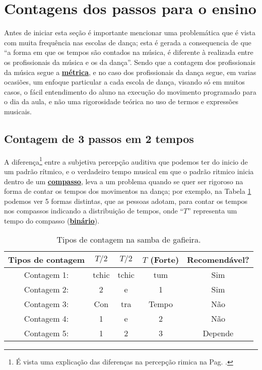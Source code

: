 \section{Contagens dos passos para o ensino}
Antes de iniciar esta seção é importante mencionar uma
problemática que é vista com muita frequência nas escolas de dança; 
esta é gerada a consequencia de que ``a forma em que os tempos são contados 
na música, é diferente à realizada entre os profissionais da música e os da dança''. 
Sendo que a contagem dos profissionais da música segue a \hyperref[def:Metrica]{\textbf{métrica}},
e no caso dos profissionais da dança segue, em varias ocasiões, 
um enfoque particular a cada escola de dança, visando só em muitos casos, 
o fácil entendimento do aluno na execução do movimento programado para o dia da aula, 
e não uma rigorosidade teórica no uso de termos e expressões musicais.



\subsection{Contagem de 3 passos em 2 tempos}
\label{susec:3passos2tempos}
A diferença\footnote{É vista uma explicação das diferenças na percepção rimica na Pag. \pageref{fig:RitmoVsFala}.} 
entre a subjetiva percepção auditiva que podemos ter do inicio de um padrão rítmico, 
e o verdadeiro tempo musical em que o padrão ritmico inicia dentro  de um \hyperref[def:Compasso]{\textbf{compasso}}, 
leva a um problema quando se quer ser rigoroso na forma de contar os tempos dos movimentos na dança; 
por exemplo, na Tabela \ref{tab:ritmo1} podemos ver 5 formas distintas, que  as pessoas adotam, 
para contar os tempos nos compassos indicando a distribuição de tempos, 
onde ``$T$'' representa um tempo do compasso (\hyperref[subsec:compassobinario]{\textbf{binário}}).
\begin{table}[!h]
  \centering
  \begin{tabular}    {c|ccc|c}
    \hline
    Tipos de contagem       & $T/2$ & $T/2$   & $T$ (Forte) & Recomendável?\\
    \hline
    Contagem 1: & tchic  & tchic  & tum   & Sim\\
    Contagem 2: & 2     & e     & 1     & Sim\\ \hline
    Contagem 3: & Con   & tra  & Tempo & Não\\
    Contagem 4: & 1     & e     & 2     & Não\\  \hline
    Contagem 5: & 1     & 2     & 3     & Depende\\ \hline
    \hline
  \end{tabular}
  \caption{Tipos de contagem na samba de gafieira.}
\label{tab:ritmo1}
\end{table}

